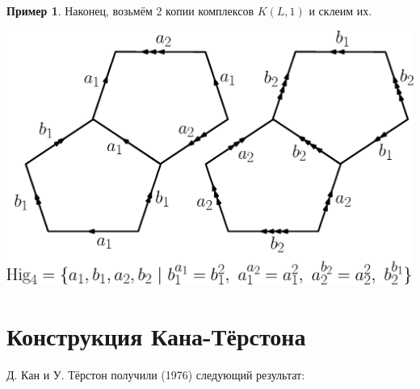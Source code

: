 \documentclass[14pt, dvipsnames]{extarticle}
\theoremstyle{definition}
\newtheorem{example}{Пример}
\theoremstyle{remark}
\begin{document}
\begin{example}
Наконец, возьмём 2 копии комплексов $K(L, 1)$ и склеим их.


\begin{center}
\includegraphics[scale=0.6]{Hig4}
\end{center}












\end{example} 











\section{Конструкция Кана-Тёрстона}




Д. Кан и У. Тёрстон получили (1976) следующий результат:
\end{document}
